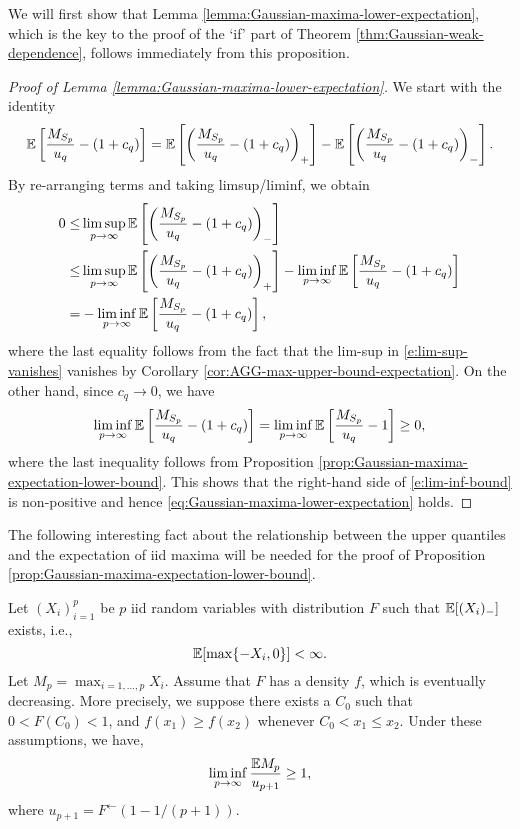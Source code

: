 We will first show that Lemma \ref{lemma:Gaussian-maxima-lower-expectation}, which is the key to the proof of the `if' part of 
Theorem \ref{thm:Gaussian-weak-dependence}, follows immediately from this proposition.

\begin{proof}[Proof of Lemma \ref{lemma:Gaussian-maxima-lower-expectation}]
We start with the identity
$$
{\mathbb E}\left[\frac{M_{S_p}}{u_q}-(1+c_q)\right] = {\mathbb E}\left[\left(\frac{M_{S_p}}{u_q}-(1+c_q)\right)_+\right] - {\mathbb E}\left[\left(\frac{M_{S_p}}{u_q}-(1+c_q)\right)_-\right].
$$
By re-arranging terms and taking limsup/liminf, we obtain
\begin{align} \label{e:lim-sup-vanishes}
    0 \le &\limsup_{p\to\infty}{\mathbb E}\left[\left(\frac{M_{S_p}}{u_q}-(1+c_q)\right)_-\right]\nonumber \\
        \le & \limsup_{p\to\infty}{\mathbb E}\left[\left(\frac{M_{S_p}}{u_q}-(1+c_q)\right)_+\right] - \liminf_{p\to\infty}{\mathbb E}\left[\frac{M_{S_p}}{u_q}-(1+c_q)\right]\\
        = & - \liminf_{p\to\infty}{\mathbb E}\left[\frac{M_{S_p}}{u_q}-(1+c_q)\right],
        \label{e:lim-inf-bound}
\end{align}
where the last equality follows from the fact that the lim-sup in \eqref{e:lim-sup-vanishes} vanishes by Corollary \ref{cor:AGG-max-upper-bound-expectation}.
On the other hand, since $c_q\to 0$, we have
$$
\liminf_{p\to\infty}{\mathbb E}\left[\frac{M_{S_p}}{u_q}-(1+c_q)\right] 
= \liminf_{p\to\infty}{\mathbb E}\left[\frac{M_{S_p}}{u_q}-1\right] \ge 0,
$$
where the last inequality follows from Proposition \ref{prop:Gaussian-maxima-expectation-lower-bound}.  This shows that 
the right-hand side of \eqref{e:lim-inf-bound} is non-positive and hence
\eqref{eq:Gaussian-maxima-lower-expectation} holds. 
\end{proof}

The following interesting fact about the relationship between the upper quantiles and the expectation of iid maxima will be needed for the 
proof of  Proposition \ref{prop:Gaussian-maxima-expectation-lower-bound}.

\begin{lemma} \label{lemma:expectation-lower}
Let $(X_i)_{i=1}^p$ be $p$ iid random variables with distribution $F$ such that ${\mathbb E}[(X_i)_-]$ exists, i.e.,
$$
{\mathbb E}[\max\{-X_i, 0\}] < \infty.
$$
Let $M_p = \max_{i=1,\ldots,p}X_i$. Assume that $F$ has a density $f$, which is eventually decreasing. 
More precisely, we suppose there exists a 
$C_0$ such that $0<F(C_0)<1$, and $f(x_1) \ge f(x_2)$ whenever $C_0 < x_1 \le x_2$. 
Under these assumptions, we have,
$$
\liminf_{p\to\infty}\frac{{\mathbb E} M_p}{u_{p+1}} \ge 1,
$$
where $u_{p+1} = F^{\leftarrow}(1 - 1/(p+1))$.
\end{lemma}

